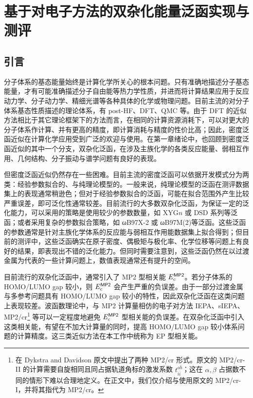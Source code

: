
\chapter{基于对电子方法的双杂化能量泛函实现与测评}
\label{sec.2.title}

\section{引言}

分子体系的基态能量始终是计算化学所关心的根本问题。只有准确地描述分子基态能量，才有可能准确描述分子自由能等热力学性质，并进而将计算结果应用于反应动力学、分子动力学、精细光谱等各种具体的化学或物理问题。目前主流的对分子体系基态性质描述的理论体系，有 post-HF、DFT、QMC 等。由于 DFT 的近似方法相比于其它理论框架下的方法而言，在相同的计算资源消耗下，可以对更大的分子体系作计算、并有更高的精度，即计算消耗与精度的性价比高；因此，密度泛函近似在计算化学应用受到广泛的欢迎与使用。在第一章绪论中，也回顾到密度泛函近似的其中一个分支，双杂化泛函，在涉及主族化学的各类反应能量、弱相互作用、几何结构、分子振动与谱学问题有良好的表现。

但密度泛函近似仍然存在一些困难。目前主流的密度泛函可以依据开发模式分为两类：经验参数拟合的、与纯理论模型的。一般来说，纯理论模型的泛函在测评数据集上的表现通常稍逊色\cite{Goerigk-Grimme.PCCP.2017}；但对于经验参数拟合的泛函，可能在拟合范围外产生比较严重误差，即可泛化性通常较差\cite{Medvedev-Lyssenko.S.2017}。目前流行的大多数双杂化泛函，为保证一定的泛化能力，可以采用的策略是使用较少的参数数量，如 XYG$n$\cite{Zhang-Xu.JPCL.2021} 或 DSD 系列\cite{Kozuch-Martin.JCC.2013}等泛函；或者采用复杂的参数拟合策略，如 ωB97X-2\cite{Chai-Head-Gordon.JCP.2009} 或 ωB97M(2)\cite{Mardirossian-Head-Gordon.JCP.2018}等泛函。这些泛函的参数通常是针对主族化学体系的反应能与弱相互作用能数据集上拟合得到；但目前的测评中，这些泛函确实在原子密度\cite{Su-Xu.PNAS.2018}、偶极矩与极化率\cite{Hait-Head-Gordon.JCTC.2018, Hait-Head-Gordon.PCCP.2018}、化学位移\cite{Stoychev-Neese.JCTC.2018}等问题上有良好的结果，即表现出不错的泛化能力。但同时需要注意到，这些泛函仍然在以过渡金属为代表的一些计算问题上，数值表现通常还有提升的空间。

目前流行的双杂化泛函中，通常引入了 MP2 型相关能 $E_\mathrm{c}^{\textsf{MP2}}$。若分子体系的 HOMO/LUMO gap 较小，则 $E_\mathrm{c}^{\textsf{MP2}}$ 会产生严重的负误差。由于一部分过渡金属与多参考问题具有 HOMO/LUMO gap 较小的特性，因此双杂化泛函在这类问题上表现较差。波函数理论中，与 MP2 计算量相仿的电子对方法 IEPA\cite{Sinanoǧlu-Sinanoǧlu.ACP.1964, Nesbet-Nesbet.ACP.1965}、sIEPA\cite{Zhang-Scheffler.PRL.2016}、MP2/cr\cite{Dykstra-Davidson.IJQC.2000}\footnote{在 Dykstra and Davidson 原文\cite{Dykstra-Davidson.IJQC.2000}中提出了两种 MP2/cr 形式。原文的 MP2/cr-II 的计算需要自旋相同且同占据轨道角标的激发系数 $t_{i \bar i}^{a \bar b}$；这在 $\alpha, \beta$ 占据数不同的情形下难以合理地定义。在正文中，我们仅介绍与使用原文的 MP2/cr-I，并将其指代为 MP2/cr。} 等可以一定程度地避免 $E_\mathrm{c}^{\textsf{MP2}}$ 型相关能的负误差。在双杂化泛函中引入这类相关能，有望在不加大计算量的同时，提高 HOMO/LUMO gap 较小体系问题的计算精度。这三类近似方法在本工作中统称为 EP 型相关能。

